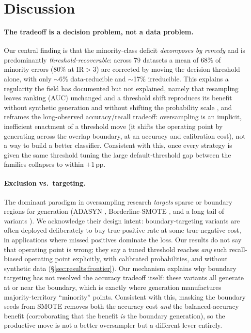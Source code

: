 \section{Discussion}\label{sec:discussion}

\paragraph{The tradeoff is a decision problem, not a data problem.} Our central
finding is that the minority-class deficit \emph{decomposes by remedy} and is
predominantly \emph{threshold-recoverable}: across 79 datasets a mean of $68\%$ of
minority errors ($80\%$ at $\mathrm{IR}>3$) are corrected by moving the decision
threshold alone, with only $\sim$6\% data-reducible and $\sim$17\% irreducible.
This explains a regularity the field has documented but not explained, namely that
resampling leaves ranking (AUC) unchanged and a threshold shift reproduces its
benefit without synthetic generation and without shifting the probability scale
\cite{provost2000imbalanced,elor2022smote,goorbergh2022harm,dalpozzolo2015calibrating},
and reframes the long-observed accuracy/recall tradeoff: oversampling is an
implicit, inefficient enactment of a threshold move (it shifts the operating point
by generating across the overlap boundary, at an accuracy and calibration cost),
not a way to build a better classifier. Consistent with this, once every strategy
is given the same threshold tuning the large default-threshold gap between the
families collapses to within $\pm1$\,pp.

\paragraph{Exclusion vs.\ targeting.} The dominant paradigm in oversampling
research \emph{targets} sparse or boundary regions for generation
(ADASYN \cite{he2008adasyn}, Borderline-SMOTE \cite{han2005borderline}, and a long
tail of variants \cite{kovacs2019smote}). We acknowledge their design intent:
boundary-targeting variants are often deployed deliberately to buy true-positive
rate at some true-negative cost, in applications where missed positives dominate
the loss. Our results do not say that operating point is wrong; they say a tuned
threshold reaches \emph{any} such recall-biased operating point explicitly,
with calibrated probabilities, and without synthetic data
(\S\ref{sec:results:frontier}). Our mechanism explains why boundary targeting has
not resolved the accuracy tradeoff itself: these variants all generate at or near
the boundary, which
is exactly where generation manufactures majority-territory ``minority'' points.
Consistent with this, masking the boundary seeds from SMOTE removes both the
accuracy cost \emph{and} the balanced-accuracy benefit (corroborating that the
benefit \emph{is} the boundary generation), so the productive move is not a
better oversampler but a different lever entirely.


